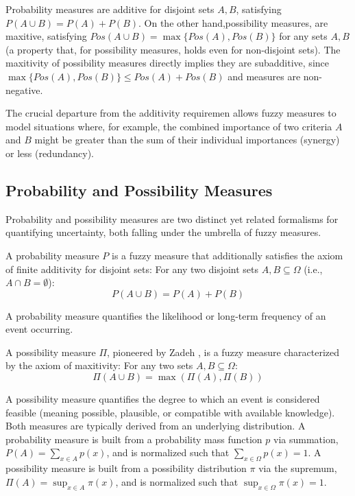 \begin{example}
    Probability measures are additive for disjoint sets $A,B$, satisfying $P(A \cup B) = P(A) + P(B)$. On the other hand,possibility measures, are maxitive, satisfying $Pos(A \cup B) = \max\{Pos(A), Pos(B)\}$ for any sets $A,B$ (a property that, for possibility measures, holds even for non-disjoint sets). The maxitivity of possibility measures directly implies they are subadditive, since $\max\{Pos(A), Pos(B)\} \leq Pos(A) + Pos(B)$ and measures are non-negative.
\end{example}


The crucial departure from the additivity requiremen allows fuzzy measures to model situations where, for example, the combined importance of two criteria $A$ and $B$ might be greater than the sum of their individual importances (synergy) or less (redundancy). 



\subsection{Probability and Possibility Measures}
Probability and possibility measures are two distinct yet related formalisms for quantifying uncertainty, both falling under the umbrella of fuzzy measures.

\begin{definition}
A probability measure $P$ is a fuzzy measure that additionally satisfies the axiom of finite additivity for disjoint sets:
For any two disjoint sets $A, B \subseteq \Omega$ (i.e., $A \cap B = \emptyset$):
\[ P(A \cup B) = P(A) + P(B) \]
\end{definition}
A probability measure quantifies the likelihood or long-term frequency of an event occurring. 


\begin{definition}
A possibility measure $\Pi$, pioneered by Zadeh \cite{Zadeh1978}, is a fuzzy measure characterized by the axiom of maxitivity:
For any two sets $A, B \subseteq \Omega$:
\[ \Pi(A \cup B) = \max(\Pi(A), \Pi(B)) \]
\end{definition}
A possibility measure quantifies the degree to which an event is considered feasible (meaning possible, plausible, or compatible with available knowledge). \\

Both measures are typically derived from an underlying distribution. A probability measure is built from a probability mass function $p$ via summation, $P(A) = \sum_{x \in A} p(x)$, and is normalized such that $\sum_{x \in \Omega} p(x) = 1$. A possibility measure is built from a possibility distribution $\pi$ via the supremum, $\Pi(A) = \sup_{x \in A} \pi(x)$, and is normalized such that $\sup_{x \in \Omega} \pi(x) = 1$.\\


